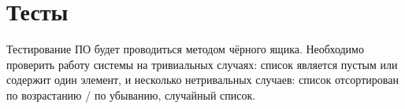     \section{Тесты}
    Тестирование ПО будет проводиться методом чёрного ящика. Необходимо проверить работу системы 
    на тривиальных случаях: список является пустым или содержит один элемент,
    и несколько нетривальных случаев: список отсортирован по возрастанию / по убыванию, случайный список.

\newpage